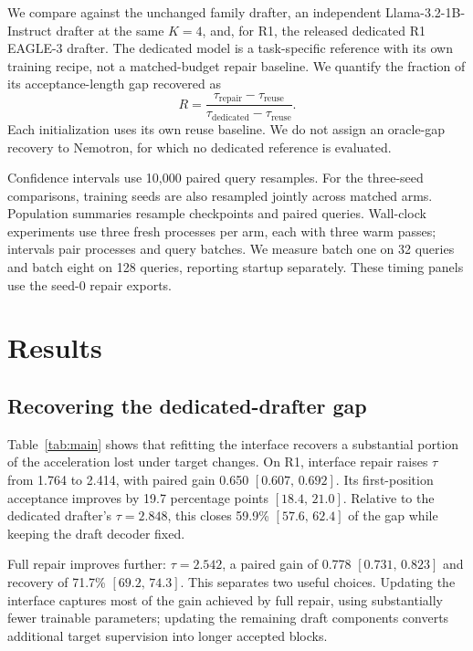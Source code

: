 \documentclass[11pt]{article}
\newcommand{\ci}[2]{[#1,\,#2]}
\begin{document}
We compare against the unchanged family drafter, an independent Llama-3.2-1B-Instruct drafter at the same $K=4$, and, for R1, the released dedicated R1 EAGLE-3 drafter. The dedicated model is a task-specific reference with its own training recipe, not a matched-budget repair baseline. We quantify the fraction of its acceptance-length gap recovered as
\begin{equation}
R=\frac{\tau_{\mathrm{repair}}-\tau_{\mathrm{reuse}}}
{\tau_{\mathrm{dedicated}}-\tau_{\mathrm{reuse}}}.
\label{eq:recovery}
\end{equation}
Each initialization uses its own reuse baseline. We do not assign an oracle-gap recovery to Nemotron, for which no dedicated reference is evaluated.

Confidence intervals use 10,000 paired query resamples. For the three-seed comparisons, training seeds are also resampled jointly across matched arms. Population summaries resample checkpoints and paired queries. Wall-clock experiments use three fresh processes per arm, each with three warm passes; intervals pair processes and query batches. We measure batch one on 32 queries and batch eight on 128 queries, reporting startup separately. These timing panels use the seed-0 repair exports.



\section{Results}
\label{sec:results}
\subsection{Recovering the dedicated-drafter gap}
Table~\ref{tab:main} shows that refitting the interface recovers a substantial portion of the acceleration lost under target changes. On R1, interface repair raises $\tau$ from 1.764 to 2.414, with paired gain 0.650 $\ci{0.607}{0.692}$. Its first-position acceptance improves by 19.7 percentage points $\ci{18.4}{21.0}$. Relative to the dedicated drafter's $\tau=2.848$, this closes 59.9\% $\ci{57.6}{62.4}$ of the gap while keeping the draft decoder fixed.

Full repair improves further: $\tau=2.542$, a paired gain of 0.778 $\ci{0.731}{0.823}$ and recovery of 71.7\% $\ci{69.2}{74.3}$. This separates two useful choices. Updating the interface captures most of the gain achieved by full repair, using substantially fewer trainable parameters; updating the remaining draft components converts additional target supervision into longer accepted blocks.
\end{document}
